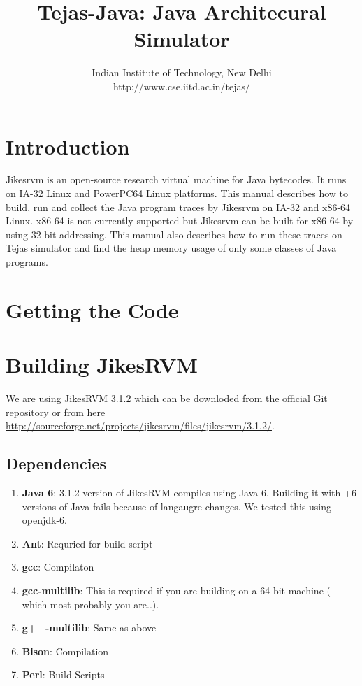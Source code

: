 \documentclass[a4paper]{article}
\title{\huge{Tejas-Java: Java Architecural Simulator}}
\author{Indian Institute of Technology, New Delhi\\
http://www.cse.iitd.ac.in/tejas/}
\date{}
\begin{document}
\maketitle

\section{Introduction}
Jikesrvm is an open-source research virtual machine for Java bytecodes. It runs on IA-32
Linux and PowerPC64 Linux platforms. This manual describes how to build, run and collect
the Java program traces by Jikesrvm on IA-32 and x86-64 Linux. x86-64 is not currently
supported but Jikesrvm can be built for x86-64 by using 32-bit addressing. This manual also
describes how to run these traces on Tejas simulator and find the heap memory usage of only
some classes of Java programs.

\section{Getting the Code}

\section{Building JikesRVM}
We are using JikesRVM 3.1.2 which can be downloded from the official Git repository or from here \url{http://sourceforge.net/projects/jikesrvm/files/jikesrvm/3.1.2/}.
\subsection{Dependencies}
\begin{enumerate}
\item \textbf{Java 6}: 3.1.2 version of JikesRVM compiles using Java 6. Building it with +6 versions of Java fails because of langaugre changes. We tested this using openjdk-6.
\item \textbf{Ant}: Requried for build script
\item \textbf{gcc}: Compilaton
\item \textbf{gcc-multilib}: This is required if you are building on a 64 bit machine ( which most probably you are..).
\item \textbf{g++-multilib}: Same as above
\item \textbf{Bison}: Compilation
\item \textbf{Perl}: Build Scripts
\end{enumerate}
\end{document}

